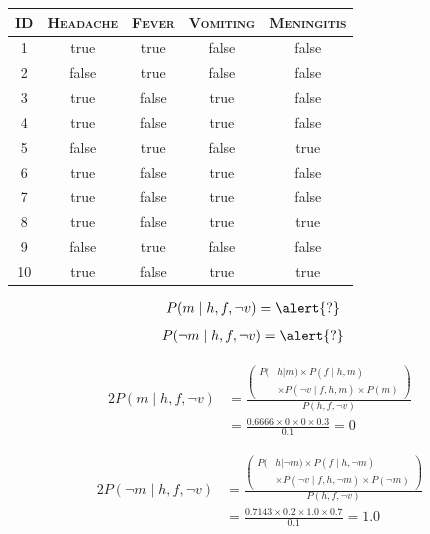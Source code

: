 \documentclass[xcolor={table}]{beamer}
\newcommand{\featN}[1]{\textsc{#1}}
\begin{document}
\begin{frame}[plain]
\begin{table}[!tb]
\centering
\begin{footnotesize}
\begin{tabular}{ccccc}
\hline
\featN{ID} & \featN{Headache} & \featN{Fever} & \featN{Vomiting} & \featN{Meningitis}\\
\hline
1 & true & true & false & false\\
2 & false & true & false & false\\
3 & true & false & true & false\\
4 & true & false & true & false\\
5 & false & true & false & true\\
6 & true & false & true & false\\
7 & true & false & true & false\\
8 & true & false & true & true\\
9 & false & true & false & false\\
10 & true & false & true & true\\
\hline
\end{tabular}
\end{footnotesize}
\end{table}

\begin{alignat*}{2}
P(m \mid h, f, \lnot v)&=\alert{?}
\end{alignat*}
\begin{alignat*}{2}
P(\lnot m \mid h, f, \lnot v)&=\alert{?}
\end{alignat*}
\end{frame}

 \begin{frame} 
\begin{alignat*}{2}
P(m \mid h, f, \lnot v)&=\frac{ \left(
\begin{aligned}
P(&h|m)  \times P(f\mid h,m)\\
&\times P(\lnot v\mid f, h,m) \times P(m)
\end{aligned}
\right)
}{P(h, f, \lnot v)}\\
&=\frac{0.6666 \times 0 \times 0 \times  0.3}{0.1}=0
\end{alignat*}
\end{frame} 



 \begin{frame} 
\begin{alignat*}{2}
P(\lnot m \mid h, f, \lnot v)&=\frac{ \left(
\begin{aligned}
P(&h|\lnot m)  \times P(f \mid h,\lnot m)\\
&\times P(\lnot v \mid f, h,\lnot m) \times P(\lnot m)
\end{aligned} 
\right)
}{P(h, f, \lnot v)}\\
&=\frac{0.7143 \times 0.2 \times 1.0 \times 0.7}{0.1}=1.0
\end{alignat*}
\end{frame} 
\end{document}
